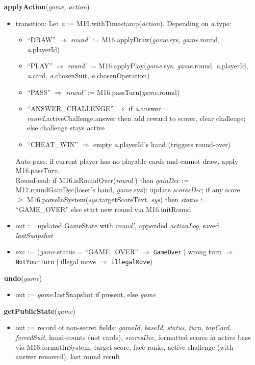 \documentclass[12pt, titlepage]{article}
\begin{document}
\noindent\textbf{applyAction}(\textit{game, action})
\begin{itemize}
    \item transition: Let \textit{a} := M19.withTimestamp(\textit{action}). Depending on \textit{a}.type:
    \begin{itemize}
        \item ``DRAW'' $\Rightarrow$ \textit{round'} := M16.applyDraw(\textit{game}.sys, \textit{game}.round, \textit{a}.playerId)
        \item ``PLAY'' $\Rightarrow$ \textit{round'} := M16.applyPlay(\textit{game}.sys, \textit{game}.round, \textit{a}.playerId, \textit{a}.card, \textit{a}.chosenSuit, \textit{a}.chosenOperation)
        \item ``PASS'' $\Rightarrow$ \textit{round'} := M16.passTurn(\textit{game}.round)
        \item ``ANSWER\_CHALLENGE'' $\Rightarrow$ if \textit{a}.answer = \textit{round}.activeChallenge.answer then add reward to scorer, clear challenge; else challenge stays active
        \item ``CHEAT\_WIN'' $\Rightarrow$ empty \textit{a}.playerId's hand (triggers round-over)
    \end{itemize}
    Auto-pass: if current player has no playable cards and cannot draw, apply M16.passTurn.\\
    Round-end: if M16.isRoundOver(\textit{round'}) then \textit{gainDec} := M17.roundGainDec(loser's hand, \textit{game}.sys); update \textit{scoresDec}; if any score $\geq$ M16.parseInSystem(\textit{sys}.targetScoreText, \textit{sys}) then \textit{status} := ``GAME\_OVER'' else start new round via M16.initRound.
    \item out := updated GameState with \textit{round'}, appended \textit{actionLog}, saved \textit{lastSnapshot}
    \item exc := (\textit{game}.status = ``GAME\_OVER'' $\Rightarrow$ \texttt{GameOver} $|$ wrong turn $\Rightarrow$ \texttt{NotYourTurn} $|$ illegal move $\Rightarrow$ \texttt{IllegalMove})
\end{itemize}

\noindent\textbf{undo}(\textit{game})
\begin{itemize}
    \item out := \textit{game}.lastSnapshot if present, else \textit{game}
\end{itemize}

\noindent\textbf{getPublicState}(\textit{game})
\begin{itemize}
    \item out := record of non-secret fields: \textit{gameId}, \textit{baseId}, \textit{status}, \textit{turn}, \textit{topCard}, \textit{forcedSuit}, hand-counts (not cards), \textit{scoresDec}, formatted scores in active base via M16.formatInSystem, target score, face ranks, active challenge (with answer removed), last round result
\end{itemize}
\end{document}
